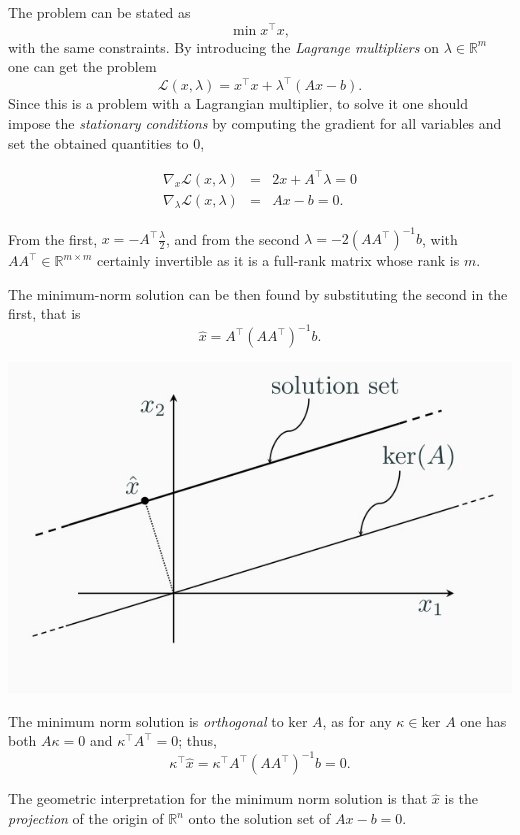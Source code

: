 \documentclass[10pt]{report}
\begin{document}
The problem can be stated as $$\min x^\top x,$$ with the same constraints. By introducing the \emph{Lagrange multipliers} on \(\lambda \in \mathbb {R}^m\) one can get the problem \[\mathcal{L}(x, \lambda) = x^\top x + \lambda^\top (Ax - b).\] Since this is a problem with a Lagrangian multiplier, to solve it one should impose the \emph{stationary conditions} by computing the gradient for all variables and set the obtained quantities to \(0\),

\[\begin{array}{rcl}
\nabla_x \mathcal{L}(x, \lambda) & = & 2x + A^\top \lambda = 0\\
\nabla_\lambda \mathcal{L}(x, \lambda) & = & Ax - b = 0.
\end{array} \]

From the first, \(x = -A^\top \frac \lambda 2\), and from the second \(\lambda = -2(AA^\top)^{-1}b\), with \(AA^\top \in \mathbb{R}^{m \times m}\) certainly invertible as it is a full\--rank matrix whose rank is \(m\).

The minimum\--norm solution can be then found by substituting the second in the first, that is $$\hat x = A^\top(AA^\top)^{-1}b.$$

\begin{center}
\includegraphics[scale=0.3]{./pics/alg/mns.jpg}
\end{center}

The minimum norm solution is \emph{orthogonal} to \(\mbox{ker }A\), as for any \(\kappa \in \mbox{ker }A\) one has both \(A\kappa = 0\) and \(\kappa^\top A^\top = 0\); thus,
$$\kappa^\top \hat x = \kappa^\top A^\top (AA^\top)^{-1}b = 0.$$

The geometric interpretation for the minimum norm solution is that \(\hat x\) is the \emph{projection} of the origin of \(\mathbb{R}^n\) onto the solution set of \(Ax - b =0\).
\end{document}
